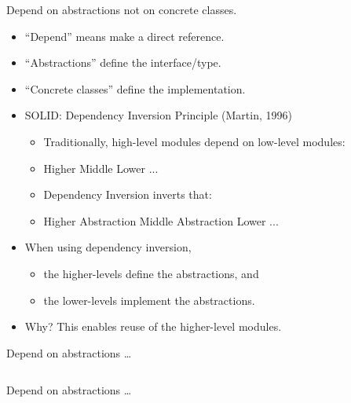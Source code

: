 \documentclass{beamer}
\begin{document}
\begin{frame}{Depend on abstractions not on concrete classes.}
    \begin{itemize}
        \item ``Depend'' means make a direct reference.
        \item ``Abstractions'' define the interface/type.
        \item ``Concrete classes'' define the implementation.
        \item SOLID: Dependency Inversion Principle (Martin, 1996)
        \begin{itemize}
            \item Traditionally, high-level modules depend on low-level modules:
            \item Higher \textrightarrow{} Middle \textrightarrow{} Lower \textrightarrow{} ...
            \item Dependency Inversion inverts that:
            \item Higher \textrightarrow{} Abstraction \textleftarrow{} Middle \textrightarrow{} Abstraction \textleftarrow{} Lower ...
        \end{itemize}
        \item When using dependency inversion, 
        \begin{itemize}
            \item the higher-levels define the abstractions, and
            \item the lower-levels implement the abstractions.
        \end{itemize}
        \item Why? This enables reuse of the higher-level modules.
    \end{itemize}
\end{frame}

\begin{frame}{Depend on abstractions \ldots}
    \vspace{0cm}
    \begin{columns}
        \column{\dimexpr\paperwidth-40pt}
        
    \end{columns}
\end{frame}

\begin{frame}{Depend on abstractions \ldots}
    \vspace{0cm}
    \begin{columns}
        \column{\dimexpr\paperwidth-40pt}
        
    \end{columns}
\end{frame}
\end{document}

